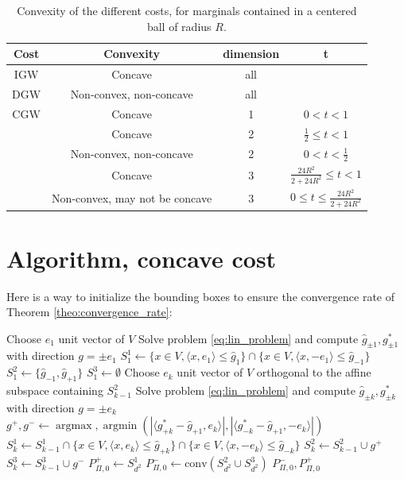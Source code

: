 \documentclass{article}
\newcommand{\1}{\mathbf{1}}
\newcommand{\DGW}{\mathrm{DGW}}
\newcommand{\CGW}{\mathrm{CGW}}
\newcommand{\IGW}{\mathrm{IGW}}
\DeclareMathOperator*{\argmax}{argmax}
\DeclareMathOperator*{\argmin}{argmin}
\theoremstyle{definition}
\theoremstyle{remark}
\begin{document}
\begin{appendices}
\begin{table}[h!]
\centering
\begin{tabular}{|c| c| c| c|} 
 \hline
 Cost & Convexity & dimension & t \\ 
 \hline
 $\IGW$ & Concave & all &  \\ 
 \hline
 $\DGW$  & Non-convex, non-concave & all &  \\
 \hline
 $\CGW$  & Concave & 1 & $0<t<1$ \\
   & Concave & 2 & $\frac{1}{2}\leq t<1$ \\
   & Non-convex, non-concave & 2 & $0< t<\frac{1}{2} $ \\ 
  & Concave & 3 & $ \frac{24R^2}{2+24R^2}\leq t < 1$  \\
   & Non-convex, may not be concave & 3 & $0\leq t \leq \frac{24R^2}{2+24R^2}$ \\ 
 \hline
\end{tabular}
\caption{Convexity of the different costs, for marginals contained in a centered ball of radius $R$.}
\label{table:1}
\end{table}



\newpage
\section{Algorithm, concave cost}\label{sec:supp_alg_cvx_ex}

Here is a way to initialize the bounding boxes to ensure the convergence rate of Theorem \ref{theo:convergence_rate}:
\begin{algorithm}
\caption{Bounding box initialization}\label{alg:bounding_box}
\begin{algorithmic}[1]
\State Choose $e_1$ unit vector of $V$
\State Solve problem \eqref{eq:lin_problem} and compute $\hat{g}_{\pm 1}, g^*_{\pm 1}$ with direction $g=\pm e_1$ 
\State $S^1_{1} \gets \{x\in V, \langle x,  e_1\rangle\leq  \hat{g}_{1}\}\cap \{x\in V, \langle x,  -e_1\rangle\leq  \hat{g}_{-1}\}$
\State $S^2_{1}\gets \{\hat{g}_{-1}, \hat{g}_{+1}\} $
\State $S^3_{1} \gets \emptyset$
   \State Choose $e_k$ unit vector of $V$ orthogonal to the affine subspace containing $S^2_{k-1}$
   \State Solve problem \eqref{eq:lin_problem} and compute $\hat{g}_{\pm k}, g^*_{\pm k}$ with direction $g=\pm e_k$ 
   \State $g^+, g^-\gets\argmax,\argmin(|\langle g^*_{ +k}-\hat{g}_{+1},e_k\rangle|, |\langle g^*_{ -k}-\hat{g}_{+1},-e_k\rangle|)$
   \State $S^1_{k} \gets S^1_{k-1}\cap\{x\in V, \langle x,  e_k\rangle\leq  \hat{g}_{+k}\}\cap \{x\in V, \langle x,  -e_k\rangle\leq  \hat{g}_{-k}\}$
   \State $S^2_{k} \gets S^2_{k-1}\cup g^+$
   \State $S^3_{k} \gets S^3_{k-1}\cup g^-$
\EndFor
\State $P_{\Pi,0}^+\gets S^1_{d^2}$ 
\State $P_{\Pi,0}^-\gets \mathrm{conv}(S^2_{d^2}\cup S^3_{d^2})$
\State \Return $P_{\Pi,0}^-,P_{\Pi,0}^+$
\end{algorithmic}
\end{algorithm}



\end{appendices}
\end{document}
